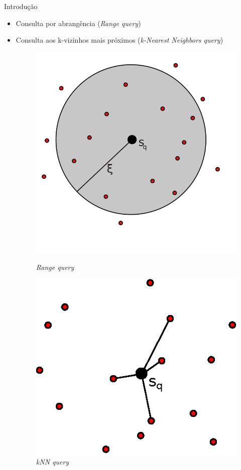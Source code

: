 \documentclass{beamer}
\begin{document}
\begin{frame}{Introdução}
  \begin{itemize}
   \item Consulta por abrangência (\textit{Range query})\newline

	
   \item Consulta aos k-vizinhos mais próximos (\textit{k-Nearest Neighbors query})

	
	\begin{figure}
\centering
\begin{minipage}{.4\textwidth}
  \centering
  \includegraphics[width=.9\linewidth]{rq.png}
  \caption{\textit{Range query}}
  \label{fig:rq}
\end{minipage}%
\begin{minipage}{.6\textwidth}
  \centering
  \includegraphics[width=.6\linewidth]{knnq.eps}
  \caption{\textit{kNN query}}
  \label{fig:knnq}
\end{minipage}
\end{figure}
	
  \end{itemize}


\end{frame}
\end{document}
